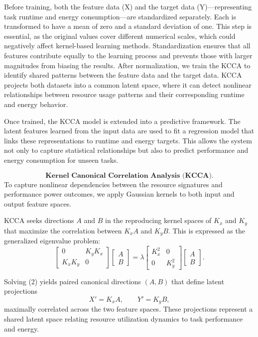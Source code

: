Before training, both the feature data (X) and the target data (Y)—representing task runtime and energy consumption—are standardized separately. Each is transformed to have a mean of zero and a standard deviation of one. This step is essential, as the original values cover different numerical scales, which could negatively affect kernel-based learning methods. Standardization ensures that all features contribute equally to the learning process and prevents those with larger magnitudes from biasing the results.
After normalization, we train the KCCA to identify shared patterns between the feature data and the target data. KCCA projects both datasets into a common latent space, where it can detect nonlinear relationships between resource usage patterns and their corresponding runtime and energy behavior.

Once trained, the KCCA model is extended into a predictive framework. The latent features learned from the input data are used to fit a regression model that links these representations to runtime and energy targets. This allows the system not only to capture statistical relationships but also to predict performance and energy consumption for unseen tasks.

\[
    \textbf{Kernel Canonical Correlation Analysis (KCCA).}
\]
To capture nonlinear dependencies between the resource signatures
and performance power outcomes, we apply Gaussian kernels to both
input and output feature spaces.

KCCA seeks directions \(A\) and \(B\) in the
reproducing kernel spaces of \(K_x\) and \(K_y\)
that maximize the correlation between
\( K_x A \) and \( K_y B \).
This is expressed as the generalized eigenvalue problem:
\[
    \begin{bmatrix}
        0       & K_y K_x \\
        K_x K_y & 0
    \end{bmatrix}
    \begin{bmatrix}
        A \\ B
    \end{bmatrix}
    =
    \lambda
    \begin{bmatrix}
        K_x^2 & 0     \\
        0     & K_y^2
    \end{bmatrix}
    \begin{bmatrix}
        A \\ B
    \end{bmatrix}.
    \tag{2}
\]

Solving (2) yields paired canonical directions
\( (A, B) \) that define latent projections
\[
    X' = K_x A, \qquad Y' = K_y B,
\]
maximally correlated across the two feature spaces.
These projections represent a shared latent space
relating resource utilization dynamics to task performance and energy.

